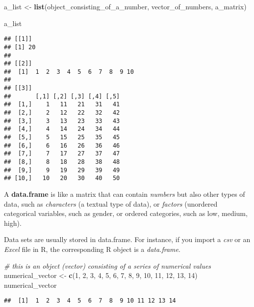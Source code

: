\documentclass[
]{article}
\newenvironment{Shaded}{\begin{snugshade}}{\end{snugshade}}
\newcommand{\CommentTok}[1]{\textcolor[rgb]{0.56,0.35,0.01}{\textit{#1}}}
\newcommand{\DecValTok}[1]{\textcolor[rgb]{0.00,0.00,0.81}{#1}}
\newcommand{\FunctionTok}[1]{\textcolor[rgb]{0.13,0.29,0.53}{\textbf{#1}}}
\newcommand{\NormalTok}[1]{#1}
\newcommand{\OtherTok}[1]{\textcolor[rgb]{0.56,0.35,0.01}{#1}}
\begin{document}
\begin{Shaded}
\begin{Highlighting}[]
\NormalTok{a\_list }\OtherTok{\textless{}{-}} \FunctionTok{list}\NormalTok{(object\_consisting\_of\_a\_number, vector\_of\_numbers, a\_matrix)}

\NormalTok{a\_list}
\end{Highlighting}
\end{Shaded}

\begin{verbatim}
## [[1]]
## [1] 20
## 
## [[2]]
##  [1]  1  2  3  4  5  6  7  8  9 10
## 
## [[3]]
##       [,1] [,2] [,3] [,4] [,5]
##  [1,]    1   11   21   31   41
##  [2,]    2   12   22   32   42
##  [3,]    3   13   23   33   43
##  [4,]    4   14   24   34   44
##  [5,]    5   15   25   35   45
##  [6,]    6   16   26   36   46
##  [7,]    7   17   27   37   47
##  [8,]    8   18   28   38   48
##  [9,]    9   19   29   39   49
## [10,]   10   20   30   40   50
\end{verbatim}

A \textbf{data.frame} is like a matrix that can contain \emph{numbers} but also other types of data, such as \emph{characters} (a textual type of data), or \emph{factors} (unordered categorical variables, such as gender, or ordered categories, such as low, medium, high).

Data sets are usually stored in data.frame. For instance, if you import a \emph{csv} or an \emph{Excel} file in R, the corresponding R object is a \emph{data.frame}.

\begin{Shaded}
\begin{Highlighting}[]
\CommentTok{\# this is an object (vector) consisting of a series of numerical values}
\NormalTok{numerical\_vector }\OtherTok{\textless{}{-}} \FunctionTok{c}\NormalTok{(}\DecValTok{1}\NormalTok{, }\DecValTok{2}\NormalTok{, }\DecValTok{3}\NormalTok{, }\DecValTok{4}\NormalTok{, }\DecValTok{5}\NormalTok{, }\DecValTok{6}\NormalTok{, }\DecValTok{7}\NormalTok{, }\DecValTok{8}\NormalTok{, }\DecValTok{9}\NormalTok{, }\DecValTok{10}\NormalTok{, }\DecValTok{11}\NormalTok{, }\DecValTok{12}\NormalTok{, }\DecValTok{13}\NormalTok{, }\DecValTok{14}\NormalTok{)}
\NormalTok{numerical\_vector}
\end{Highlighting}
\end{Shaded}

\begin{verbatim}
##  [1]  1  2  3  4  5  6  7  8  9 10 11 12 13 14
\end{verbatim}
\end{document}
